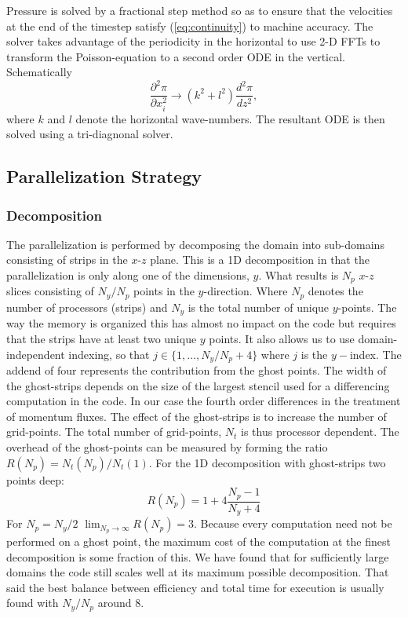 \documentclass[11pt,a4paper]{article}
\begin{document}
Pressure is solved by a fractional step method so as to ensure that
the velocities at the end of the timestep satisfy
(\ref{eq:continuity}) to machine accuracy.  The solver takes
advantage of the periodicity in the horizontal to use 2-D FFTs to
transform the Poisson-equation to a second order ODE in the
vertical. Schematically
\begin{equation}
\frac{\partial^2 \pi}{\partial x_i^2} \longrightarrow
(k^2+l^2)\frac{d^2\pi}{dz^2},
\end{equation}
where $k$ and $l$ denote the horizontal wave-numbers.  The resultant
ODE is then solved using a tri-diagnonal solver.

\subsection{Parallelization Strategy}

\subsubsection{Decomposition}
The parallelization is performed by decomposing the domain into
sub-domains consisting of strips in the $x$-$z$ plane.  This is a 1D
decomposition in that the parallelization is only along one of the
dimensions, $y.$  What results is $N_p$ $x$-$z$ slices consisting of
$N_y/N_p$ points in the $y$-direction.  Where $N_p$ denotes the number
of processors (strips) and $N_y$ is the total number of unique
$y$-points.  The way the memory is organized this has almost
no impact on the code but requires that the strips have at least two
unique $y$ points.  It also allows us to use domain-independent
indexing, so that $j \in \{1,\ldots,N_y/N_p+4\}$ where $j$ is the
$y-$index.  The addend of four represents the contribution from the
ghost points.  The width of the ghost-strips depends on the size of
the largest stencil used for a differencing computation in the code.
In our case the fourth order differences in the treatment of momentum
fluxes.  The effect of the
ghost-strips is to increase the number of grid-points.  The total
number of grid-points, $N_t$ is thus processor dependent.  The
overhead of the ghost-points can be measured by forming the ratio
$R(N_p) = N_t(N_p)/N_t(1).$  For the 1D decomposition with
ghost-strips two points deep:
\[ R(N_p) = 1 + 4\frac{N_p-1}{N_y+4} \]
For $N_p = N_y/2$ $\lim_{N_p\rightarrow\infty} R(N_p) = 3$.  Because
every computation need not be performed on a ghost point, the maximum
cost of the computation at the finest decomposition is some fraction
of this.  We have found that for sufficiently large domains the code
still scales well at its maximum possible decomposition.  That said
the best balance between efficiency and total time for execution is
usually found with $N_y/N_p$ around 8.
\end{document}
